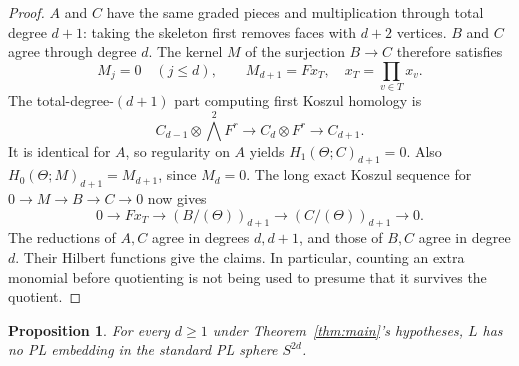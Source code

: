 \documentclass[11pt]{article}
\newtheorem{proposition}[theorem]{Proposition}
\theoremstyle{remark}
\begin{document}
\begin{proof}
$A$ and $C$ have the same graded pieces and multiplication through total
degree $d+1$: taking the skeleton first removes faces with $d+2$ vertices.
$B$ and $C$ agree through degree $d$. The kernel $M$ of the surjection
$B\to C$ therefore satisfies
\[
M_j=0\quad(j\leq d),\qquad M_{d+1}=F x_T,
\quad x_T=\prod_{v\in T}x_v.
\]
The total-degree-$(d+1)$ part computing first Koszul homology is
\[
C_{d-1}\otimes\bigwedge^2 F^r
 \longrightarrow C_d\otimes F^r\longrightarrow C_{d+1}.
\]
It is identical for $A$, so regularity on $A$ yields
$H_1(\Theta;C)_{d+1}=0$. Also
$H_0(\Theta;M)_{d+1}=M_{d+1}$, since $M_d=0$.
The long exact Koszul sequence for $0\to M\to B\to C\to0$ now gives
\[
0\longrightarrow F x_T\longrightarrow(B/(\Theta))_{d+1}
 \longrightarrow(C/(\Theta))_{d+1}\longrightarrow0.
\]
The reductions of $A,C$ agree in degrees $d,d+1$, and those of $B,C$
agree in degree $d$. Their Hilbert functions give the claims.
In particular, counting an extra monomial before quotienting is not
being used to presume that it survives the quotient.
\end{proof}

\begin{proposition}\label{prop:PL}
For every $d\geq1$ under Theorem~\ref{thm:main}'s hypotheses, $L$ has
no PL embedding in the standard PL sphere $S^{2d}$.
\end{proposition}
\end{document}
